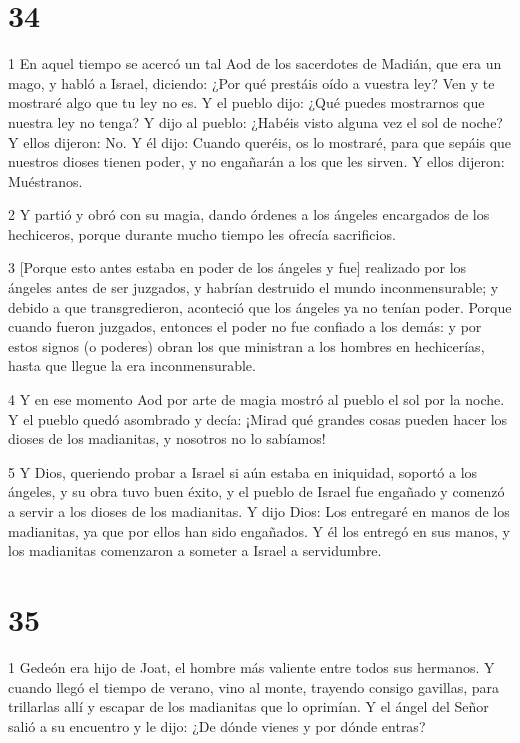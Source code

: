 \chapter{34}

\par 1 En aquel tiempo se acercó un tal Aod de los sacerdotes de Madián, que era un mago, y habló a Israel, diciendo: ¿Por qué prestáis oído a vuestra ley? Ven y te mostraré algo que tu ley no es. Y el pueblo dijo: ¿Qué puedes mostrarnos que nuestra ley no tenga? Y dijo al pueblo: ¿Habéis visto alguna vez el sol de noche? Y ellos dijeron: No. Y él dijo: Cuando queréis, os lo mostraré, para que sepáis que nuestros dioses tienen poder, y no engañarán a los que les sirven. Y ellos dijeron: Muéstranos.

\par 2 Y partió y obró con su magia, dando órdenes a los ángeles encargados de los hechiceros, porque durante mucho tiempo les ofrecía sacrificios.

\par 3 [Porque esto antes estaba en poder de los ángeles y fue] realizado por los ángeles antes de ser juzgados, y habrían destruido el mundo inconmensurable; y debido a que transgredieron, aconteció que los ángeles ya no tenían poder. Porque cuando fueron juzgados, entonces el poder no fue confiado a los demás: y por estos signos (o poderes) obran los que ministran a los hombres en hechicerías, hasta que llegue la era inconmensurable.

\par 4 Y en ese momento Aod por arte de magia mostró al pueblo el sol por la noche. Y el pueblo quedó asombrado y decía: ¡Mirad qué grandes cosas pueden hacer los dioses de los madianitas, y nosotros no lo sabíamos!

\par 5 Y Dios, queriendo probar a Israel si aún estaba en iniquidad, soportó a los ángeles, y su obra tuvo buen éxito, y el pueblo de Israel fue engañado y comenzó a servir a los dioses de los madianitas. Y dijo Dios: Los entregaré en manos de los madianitas, ya que por ellos han sido engañados. Y él los entregó en sus manos, y los madianitas comenzaron a someter a Israel a servidumbre.

\chapter{35}

\par 1 Gedeón era hijo de Joat, el hombre más valiente entre todos sus hermanos. Y cuando llegó el tiempo de verano, vino al monte, trayendo consigo gavillas, para trillarlas allí y escapar de los madianitas que lo oprimían. Y el ángel del Señor salió a su encuentro y le dijo: ¿De dónde vienes y por dónde entras?

